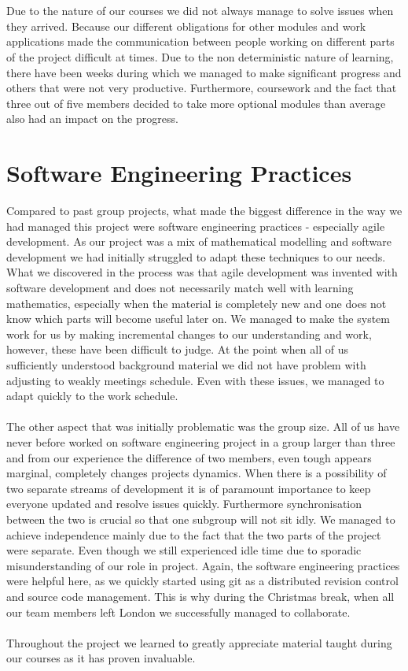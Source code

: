 \documentclass[10pt, a4paper]{report}
\begin{document}
\\\\
Due to the nature of our courses we did not always manage to solve issues when they arrived. Because our different obligations for other modules and work applications made the communication between people working on different parts of the project difficult at times. Due to the non deterministic nature of learning, there have been weeks during which we managed to make significant progress and others that were not very productive. Furthermore, coursework and the fact that three out of five members decided to take more optional modules than average also had an impact on the progress.

\section{Software Engineering Practices}\label{sec:softeng}
Compared to past group projects, what made the biggest difference in the way we had managed this project were software engineering practices - especially agile development. As our project was a mix of mathematical modelling and software development we had initially struggled to adapt these techniques to our needs. What we discovered in the process was that agile development was invented with software development and does not necessarily match well with learning mathematics, especially when the material is completely new and one does not know which parts will become useful later on. We managed to make the system work for us by making incremental changes to our understanding and work, however, these have been difficult to judge. At the point when all of us sufficiently understood background material we did not have problem with adjusting to weakly meetings schedule. Even with these issues, we managed to adapt quickly to the work schedule.
\\\\
The other aspect that was initially problematic was the group size. All of us have never before worked on software engineering project in a group larger than three and from our experience the difference of two members, even tough appears marginal, completely changes projects dynamics. When there is a possibility of two separate streams of development it is of paramount importance to keep everyone updated and resolve issues quickly. Furthermore synchronisation between the two is crucial so that one subgroup will not sit idly. We managed to achieve independence mainly due to the fact that the two parts of the project were separate. Even though we still experienced idle time due to sporadic misunderstanding of our role in project. Again, the software engineering practices were helpful here, as we quickly started  using git as a distributed revision control and source code management. This is why during the Christmas break, when all our team members left London we  successfully managed to collaborate.
\\\\
Throughout the project we learned to greatly appreciate material taught during our courses as it has proven invaluable.
\end{document}
